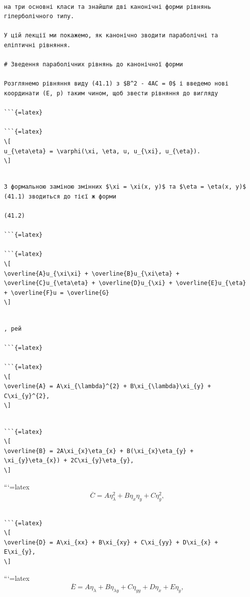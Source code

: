 \documentclass[
]{article}
\begin{document}
\begin{verbatim}

на три основні класи та знайшли дві канонічні форми рівнянь гіперболічного типу.

У цій лекції ми покажемо, як канонічно зводити параболічні та еліптичні рівняння.

# Зведення параболічних рівнянь до канонічної форми

Розглянемо рівняння виду (41.1) з $B^2 - 4AC = 0$ і введемо нові координати (E, p) таким чином, щоб звести рівняння до вигляду

```{=latex}

```{=latex}
\[
u_{\eta\eta} = \varphi(\xi, \eta, u, u_{\xi}, u_{\eta}).
\]
\end{verbatim}

\begin{verbatim}

З формальною заміною змінних $\xi = \xi(x, y)$ та $\eta = \eta(x, y)$ (41.1) зводиться до тієї ж форми

(41.2)

```{=latex}

```{=latex}
\[
\overline{A}u_{\xi\xi} + \overline{B}u_{\xi\eta} + \overline{C}u_{\eta\eta} + \overline{D}u_{\xi} + \overline{E}u_{\eta} + \overline{F}u = \overline{G}
\]
\end{verbatim}

\begin{verbatim}

, рей

```{=latex}

```{=latex}
\[
\overline{A} = A\xi_{\lambda}^{2} + B\xi_{\lambda}\xi_{y} + C\xi_{y}^{2},
\]
\end{verbatim}

\begin{verbatim}

```{=latex}
\[
\overline{B} = 2A\xi_{x}\eta_{x} + B(\xi_{x}\eta_{y} + \xi_{y}\eta_{x}) + 2C\xi_{y}\eta_{y},
\]
\end{verbatim}

```{=latex}
\[
\overline{C} = A\eta_{\lambda}^{2} + B\eta_{x}\eta_{y} + C\eta_{y}^{2},
\]

\begin{verbatim}

```{=latex}
\[
\overline{D} = A\xi_{xx} + B\xi_{xy} + C\xi_{yy} + D\xi_{x} + E\xi_{y},
\]
\end{verbatim}

```{=latex}
\[
\overline{E} = A\eta_{\lambda} + B\eta_{\lambda y} + C\eta_{yy} + D\eta_{x} + E\eta_{y},
\]
\end{document}
